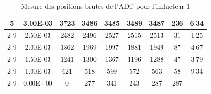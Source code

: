\begin{table}[H]
{\begin{tabular}{|c|c|c|c|c|c|c|c|c|}
            \multirow{6}{*}{5} & 3.00E-03         & 3723      & 3486                                                       & 3485                                                      & 3489                                                      & 3487    & 236    & 6.34                                                               \\ \cline{2-9}
                               & 2.50E-03         & 2482      & 2496                                                       & 2527                                                      & 2515                                                      & 2513    & 31     & 1.25                                                               \\ \cline{2-9}
                               & 2.00E-03         & 1862      & 1969                                                       & 1997                                                      & 1881                                                      & 1949    & 87     & 4.67                                                               \\ \cline{2-9}
                               & 1.50E-03         & 1241      & 1300                                                       & 1367                                                      & 1196                                                      & 1288    & 47     & 3.79                                                               \\ \cline{2-9}
                               & 1.00E-03         & 621       & 518                                                        & 599                                                       & 572                                                       & 563     & 58     & 9.34                                                               \\ \cline{2-9}
                               & 0.00E+00         & 0         & 277                                                        & 341                                                       & 243                                                       & 287     & 287    & -                                                                  \\ \hline
        \end{tabular}%
    }
    \caption{Mesure des positions brutes de l'ADC pour l'inducteur 1}
    \label{tab:adc_brut_inducteur1}
\end{table}

